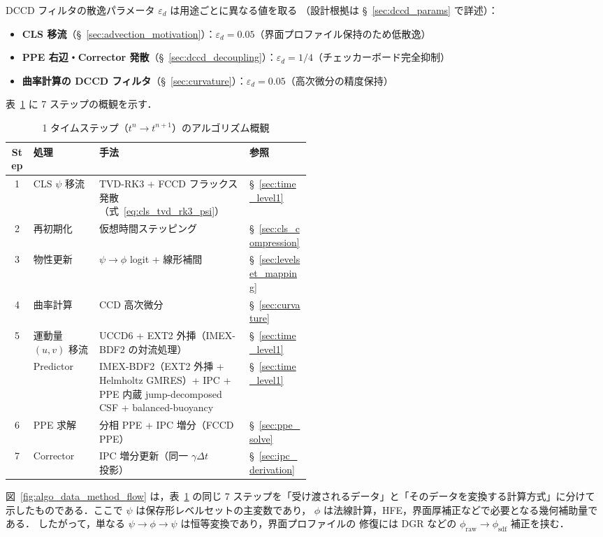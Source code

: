 DCCD フィルタの散逸パラメータ $\varepsilon_d$ は用途ごとに異なる値を取る
（設計根拠は §~\ref{sec:dccd_params} で詳述）：
\begin{itemize}[noitemsep]
  \item \textbf{CLS 移流}（§~\ref{sec:advection_motivation}）：$\varepsilon_d = 0.05$（界面プロファイル保持のため低散逸）
  \item \textbf{PPE 右辺・Corrector 発散}（§~\ref{sec:dccd_decoupling}）：$\varepsilon_d = 1/4$（チェッカーボード完全抑制）
  \item \textbf{曲率計算の DCCD フィルタ}（§~\ref{sec:curvature}）：$\varepsilon_d = 0.05$（高次微分の精度保持）
\end{itemize}

表~\ref{tab:algo_overview} に 7 ステップの概観を示す．

\begin{table}[htbp]
\centering
\caption{1 タイムステップ（$t^n \to t^{n+1}$）のアルゴリズム概観}
\label{tab:algo_overview}
\small
\begin{tabular}{clp{0.50\linewidth}l}
\hline
Step & 処理 & 手法 & 参照 \\
\hline
1 & CLS $\psi$ 移流 & TVD-RK3 + FCCD フラックス発散（式~\eqref{eq:cls_tvd_rk3_psi}） & §~\ref{sec:time_level1} \\
2 & 再初期化        & 仮想時間ステッピング                            & §~\ref{sec:cls_compression} \\
3 & 物性更新        & $\psi\!\to\!\phi$ logit + 線形補間              & §~\ref{sec:levelset_mapping} \\
4 & 曲率計算        & CCD 高次微分                                   & §~\ref{sec:curvature} \\
5 & 運動量 $(u,v)$ 移流 & UCCD6 + EXT2 外挿（IMEX-BDF2 の対流処理） & §~\ref{sec:time_level1} \\
  & Predictor      & IMEX-BDF2（EXT2 外挿 + Helmholtz GMRES）+ IPC + PPE 内蔵 jump-decomposed CSF + balanced-buoyancy & §~\ref{sec:time_level1} \\
6 & PPE 求解       & 分相 PPE + IPC 増分（FCCD PPE）                  & §~\ref{sec:ppe_solve} \\
7 & Corrector      & IPC 増分更新（同一 $\gamma\Delta t$ 投影）        & §~\ref{sec:ipc_derivation} \\
\hline
\end{tabular}
\end{table}

図~\ref{fig:algo_data_method_flow} は，表~\ref{tab:algo_overview} の同じ
7 ステップを「受け渡されるデータ」と「そのデータを変換する計算方式」に分けて
示したものである．ここで $\psi$ は保存形レベルセットの主変数であり，
$\phi$ は法線計算，HFE，界面厚補正などで必要となる幾何補助量である．
したがって，単なる $\psi\to\phi\to\psi$ は恒等変換であり，界面プロファイルの
修復には DGR などの $\phi_{\mathrm{raw}}\to\phi_{\mathrm{sdf}}$ 補正を挟む．

